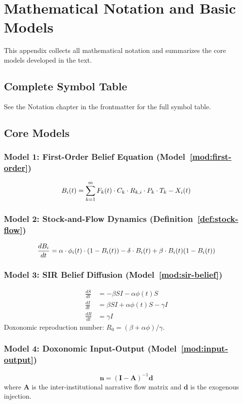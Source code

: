 \chapter{Mathematical Notation and Basic Models}
\label{app:math-notation}

This appendix collects all mathematical notation and summarizes the core models developed in the text.

\section*{Complete Symbol Table}

See the Notation chapter in the frontmatter for the full symbol table.

\section*{Core Models}

\subsection*{Model 1: First-Order Belief Equation (Model~\ref{mod:first-order})}
\[
  B_{i}(t) = \sum_{k=1}^{m} F_{k}(t) \cdot C_{k} \cdot R_{k,i} \cdot P_{k} \cdot T_{k} - X_{i}(t)
\]

\subsection*{Model 2: Stock-and-Flow Dynamics (Definition~\ref{def:stock-flow})}
\[
  \frac{dB_{i}}{dt} = \alpha \cdot \phi_i(t) \cdot (1 - B_{i}(t)) - \delta \cdot B_{i}(t) + \beta \cdot B_{i}(t)(1 - B_{i}(t))
\]

\subsection*{Model 3: SIR Belief Diffusion (Model~\ref{mod:sir-belief})}
\begin{align*}
  \frac{dS}{dt} &= -\beta S I - \alpha \phi(t) S \\
  \frac{dI}{dt} &= \beta S I + \alpha \phi(t) S - \gamma I \\
  \frac{dR}{dt} &= \gamma I
\end{align*}
Doxonomic reproduction number: $R_0 = (\beta + \alpha\phi)/\gamma$.

\subsection*{Model 4: Doxonomic Input-Output (Model~\ref{mod:input-output})}
\[
  \bm{n} = (\bm{I} - \bm{A})^{-1}\bm{d}
\]
where $\bm{A}$ is the inter-institutional narrative flow matrix and $\bm{d}$ is the exogenous injection.

